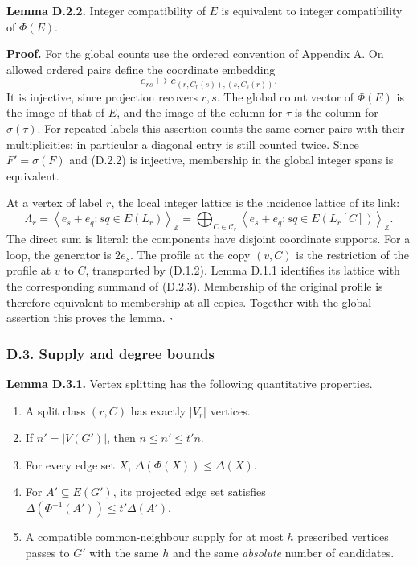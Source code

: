 \documentclass[english,11pt,a4paper]{article}
\providecommand{\tightlist}{\setlength{\itemsep}{0pt}\setlength{\parskip}{0pt}}
\begin{document}
\textbf{Lemma D.2.2.} Integer compatibility of \(E\) is equivalent to integer compatibility of \(\Phi(E)\).

\textbf{Proof.} For the global counts use the ordered convention of Appendix A. On allowed ordered pairs define the coordinate embedding \[e_{rs}\longmapsto e_{(r,C_r(s)),(s,C_s(r))}.
\tag{D.2.2}\] It is injective, since projection recovers \(r,s\). The global count vector of \(\Phi(E)\) is the image of that of \(E\), and the image of the column for \(\tau\) is the column for \(\sigma(\tau)\). For repeated labels this assertion counts the same corner pairs with their multiplicities; in particular a diagonal entry is still counted twice. Since \(F'=\sigma(F)\) and (D.2.2) is injective, membership in the global integer spans is equivalent.

At a vertex of label \(r\), the local integer lattice is the incidence lattice of its link: \[\Lambda_r=\left\langle e_s+e_q:sq\in E(L_r)\right\rangle_{\mathbb Z}
=\bigoplus_{C\in\mathcal C_r}
\left\langle e_s+e_q:sq\in E(L_r[C])\right\rangle_{\mathbb Z}.
\tag{D.2.3}\] The direct sum is literal: the components have disjoint coordinate supports. For a loop, the generator is \(2e_s\). The profile at the copy \((v,C)\) is the restriction of the profile at \(v\) to \(C\), transported by (D.1.2). Lemma D.1.1 identifies its lattice with the corresponding summand of (D.2.3). Membership of the original profile is therefore equivalent to membership at all copies. Together with the global assertion this proves the lemma. \(\square\)

\subsubsection{D.3. Supply and degree bounds}\label{d.3.-supply-and-degree-bounds}

\textbf{Lemma D.3.1.} Vertex splitting has the following quantitative properties.

\begin{enumerate}
\def\labelenumi{\arabic{enumi}.}
\tightlist
\item
  A split class \((r,C)\) has exactly \(|V_r|\) vertices.
\item
  If \(n'=|V(G')|\), then \(n\le n'\le t'n\).
\item
  For every edge set \(X\), \(\Delta(\Phi(X))\le\Delta(X)\).
\item
  For \(A'\subseteq E(G')\), its projected edge set satisfies \(\Delta(\Phi^{-1}(A'))\le t'\Delta(A')\).
\item
  A compatible common-neighbour supply for at most \(h\) prescribed vertices passes to \(G'\) with the same \(h\) and the same \emph{absolute} number of candidates.
\end{enumerate}
\end{document}

